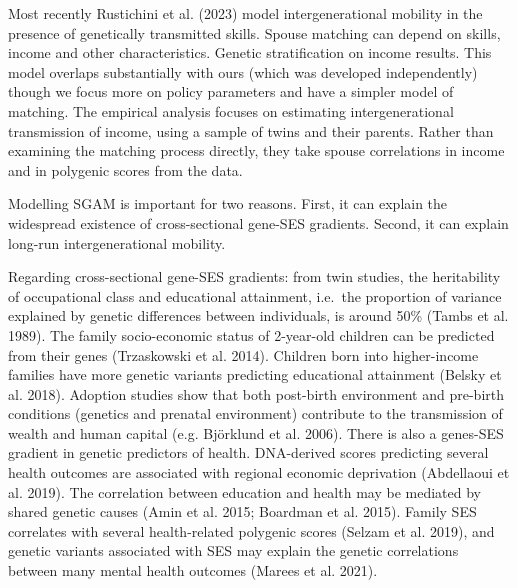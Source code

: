 \documentclass[
  12pt,
]{article}
\theoremstyle{definition}
\theoremstyle{definition}
\theoremstyle{definition}
\theoremstyle{definition}
\theoremstyle{remark}
\begin{document}
Most recently Rustichini et al. (2023) model intergenerational
mobility in the presence of genetically transmitted skills. Spouse
matching can depend on skills, income and other characteristics. Genetic
stratification on income results. This model overlaps substantially with
ours (which was developed independently) though we focus more on policy
parameters and have a simpler model of matching. The empirical analysis
focuses on estimating intergenerational transmission of income, using a
sample of twins and their parents. Rather than examining the matching
process directly, they take spouse correlations in income and in
polygenic scores from the data.

Modelling SGAM is important for two reasons. First, it can explain the
widespread existence of cross-sectional gene-SES gradients. Second, it
can explain long-run intergenerational mobility.

Regarding cross-sectional gene-SES gradients: from twin studies, the
heritability of occupational class and educational attainment, i.e.~the
proportion of variance explained by genetic differences between
individuals, is around 50\% (Tambs et al. 1989). The family socio-economic
status of 2-year-old children can be predicted from their genes
(Trzaskowski et al. 2014). Children born into higher-income families have more
genetic variants predicting educational attainment ({Belsky et al.} 2018).
Adoption studies show that both post-birth environment and pre-birth
conditions (genetics and prenatal environment) contribute to the
transmission of wealth and human capital (e.g. Björklund et al. 2006).
There is also a genes-SES gradient in genetic predictors of health.
DNA-derived scores predicting several health outcomes are associated
with regional economic deprivation ({Abdellaoui et al.} 2019). The
correlation between education and health may be mediated by shared
genetic causes (Amin et al. 2015; Boardman et al. 2015). Family SES
correlates with several health-related polygenic scores
(Selzam et al. 2019), and genetic variants associated with SES may
explain the genetic correlations between many mental health outcomes
(Marees et al. 2021).
\end{document}
